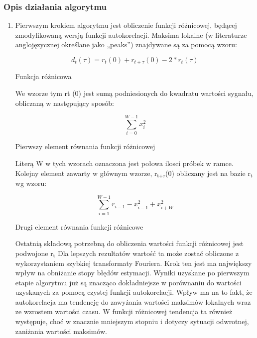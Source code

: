 \documentclass[a4paper,12 pt]{article}
\begin{document}
\subsubsection{Opis działania algorytmu}
\begin{enumerate}
\item Pierwszym krokiem algorytmu jest obliczenie funkcji różnicowej, będącej zmodyfikowaną wersją funkcji autokorelacji. Maksima lokalne (w literaturze anglojęzycznej określane jako „peaks”) znajdywane są za pomocą wzoru:

\begin{mycapequ}[h]

\begin{equation}
d_{t}(\tau)=r_{t}(0)+r_{t+\tau}(0) - 2*r_{t}(\tau)       
\end{equation}
\caption{Funkcja różnicowa}
\end{mycapequ} 
\FloatBarrier
We wzorze tym  rt (0) jest sumą podniesionych do kwadratu wartości sygnału, obliczaną w następujący sposób:

\begin{mycapequ}[h]
\begin{equation}
\sum\limits_{i=0}^{W-1} x_{i}^2
\end{equation}
\caption{Pierwszy element równania funkcji różnicowej}
\end{mycapequ} 
\FloatBarrier

Literą W w tych wzorach oznaczona jest połowa ilosci próbek w ramce. Kolejny element zawarty w głównym wzorze, r$_{\text{t+$\tau$}}$(0) obliczany jest na bazie r$_{\text{t}}$ wg wzoru:

\begin{mycapequ}[h]
\begin{equation}
\sum\limits_{i=1}^{W-1} r_{i-1}-x_{i-1}^2+x_{i+W}^2
\end{equation}
\caption{Drugi element równania funkcji różnicowe}
\end{mycapequ} 
\FloatBarrier



Ostatnią składową potrzebną do obliczenia wartości funkcji różnicowej jest podwojone  r$_{\text{t}}$
Dla lepszych rezultatów wartość ta może zostać obliczone z wykorzystaniem szybkiej transformaty Fouriera.
Krok ten jest ma największy wpływ na obniżanie stopy błędów estymacji. Wyniki uzyskane po pierwszym etapie algorytmu już są znacząco dokładniejsze w porównaniu do wartości uzyskanych za pomocą czystej funkcji autokorelacji. Wpływ ma na to fakt, że autokorelacja ma tendencję do zawyżania wartości maksimów lokalnych wraz ze wzrostem wartości czasu. W funkcji różnicowej tendencja ta również występuje, choć w znacznie mniejszym stopniu i dotyczy sytuacji odwrotnej, zaniżania wartości maksimów.


\end{enumerate}
\end{document}
